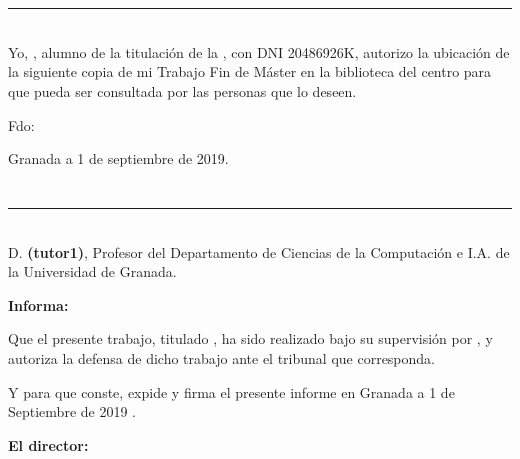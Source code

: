 \chapter*{}
\thispagestyle{empty}

\noindent\rule[-1ex]{\textwidth}{2pt}\\[4.5ex]

Yo, \textbf{\myName}, alumno de la titulación \myDegree de la \textbf{\myFaculty}, con DNI 20486926K, autorizo la
ubicación de la siguiente copia de mi Trabajo Fin de Máster en la biblioteca del centro para que pueda ser
consultada por las personas que lo deseen.

\vspace{6cm}

\noindent Fdo: \myName

\vspace{2cm}

\begin{flushright}
Granada a 1 de septiembre de 2019.
\end{flushright}


\chapter*{}
\thispagestyle{empty}

\noindent\rule[-1ex]{\textwidth}{2pt}\\[4.5ex]

D. \textbf{\myProf (tutor1)}, Profesor del Departamento de Ciencias de la Computación e I.A. de la Universidad de Granada.

\vspace{0.5cm}

\textbf{Informa:}

\vspace{0.5cm}

Que el presente trabajo, titulado \textit{\textbf{\myTitle}},
ha sido realizado bajo su supervisión por \textbf{\myName}, y autoriza la defensa de dicho trabajo ante el tribunal que corresponda.

\vspace{0.5cm}

Y para que conste, expide y firma el presente informe en Granada a 1 de Septiembre de 2019 .

\vspace{1cm}

\textbf{El director:}

\vspace{5cm}

